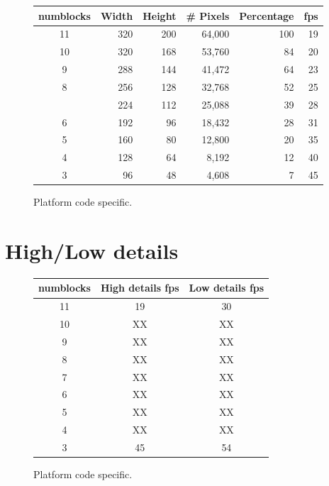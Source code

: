 \begin{figure}[H]
\centering  
\begin{tabularx}{\textwidth}{ C{1}  R{1} R{1} R{1}  R{1.4}  R{0.6} }
  \toprule
  \textbf{numblocks} & \textbf{Width} & \textbf{Height} & \textbf{\# Pixels} & \textbf{Percentage} & \textbf{fps}\\
  \toprule 

11 & 320 & 200 & 64,000 & 100 & 19 \\
10 & 320 & 168 & 53,760 &  84 & 20 \\
 9 & 288 & 144 & 41,472 &  64 & 23 \\
 8 & 256 & 128 & 32,768 &  52 & 25 \\
 \protect{} & 224 & 112 & 25,088 &  39 & 28 \\
 6 & 192 & 96 & 18,432 &  28 & 31  \\
 5 & 160 & 80 & 12,800 &  20 & 35  \\
 4 & 128 & 64 &  8,192 &  12 & 40  \\
 3 &  96 & 48 &  4,608 &   7 & 45  \\
   \toprule
\end{tabularx}
\caption{Platform code specific.}
\end{figure}

\par


\section{High/Low details}

\begin{figure}[H]
\centering  
\begin{tabularx}{0.7\textwidth}{ C{1}  C{1} C{1}}
  \toprule
  \textbf{numblocks} & \textbf{High details fps} &  \textbf{Low details fps}\\
  \toprule 

            
11 &  19     &        30 \\
10  &  XX      &      XX \\
9  &  XX      &       XX \\
8  &  XX      &       XX \\
7  &  XX      &       XX \\
6  &  XX      &       XX \\
5  &  XX      &       XX \\
4  &  XX      &       XX \\
3  &  45      &       54 \\
  \toprule
\end{tabularx}
\caption{Platform code specific.}
\end{figure}

